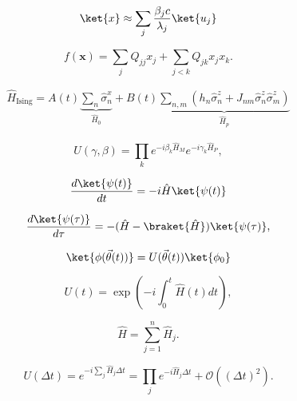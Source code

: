 \begin{equation}

\ket{x} \approx
\sum_j \frac{\beta_j c}{\lambda_j} \ket{u_j} 
\end{equation}

\begin{equation}
\label{eq:qubo}
f(\mathbf{x}) = \sum_j Q_{jj} x_j + \sum_{j<k} Q_{jk} x_j x_k.
\end{equation}

\begin{align}

\hat{H}_\text{Ising} = A(t) \underbrace{\sum_n \hat{\sigma}^x_n}_{\hat{H}_0} + 
B(t) \underbrace{\sum_{n,m} 
\left( 
h_n \hat{\sigma}^z_n + 
J_{nm} \hat{\sigma}^z_n \hat{\sigma}^z_m 
\right)}_{\hat{H}_p}
\end{align}

\begin{equation}

U(\gamma,\beta) = \prod_k e^{-i\beta_k\hat{H}_M} e^{-i\gamma_k\hat{H}_P},
\end{equation}

\begin{equation}

\frac{d\ket{\psi(t)}}{dt} = -i\hat{H} \ket{\psi(t)}
\end{equation}

\begin{equation}

\frac{d\ket{\psi(\tau)}}{d\tau} = -(\hat{H} - \braket{\hat{H}}) \ket{\psi(\tau)}, 
\end{equation}

\begin{equation}

\ket{\phi(\vec{\theta}(t))} = U(\vec{\theta}(t)) \ket{\phi_0}
\end{equation}

\begin{equation}

U(t) = \exp \left( -i \int_0^t \hat{H}(t) dt \right), 
\end{equation}

\begin{equation}

\hat{H} = \sum_{j=1}^n \hat{H}_j.
\end{equation}

\begin{equation}
\label{eq:STformula}
U(\Delta t) 
= e^{-i \sum_j \hat{H}_j \Delta t}
= \prod_j e^{-i\hat{H}_j\Delta t} + \mathcal{O}((\Delta t)^2).
\end{equation}

